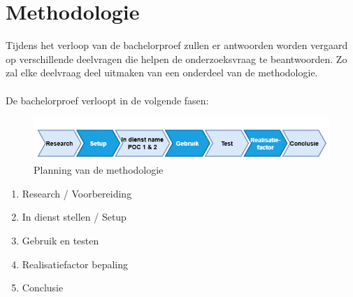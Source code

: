 

\section{Methodologie}%
\label{sec:methodologie}


Tijdens het verloop van de bachelorproef zullen er antwoorden worden vergaard op verschillende deelvragen die helpen de onderzoeksvraag te beantwoorden. Zo zal elke deelvraag deel uitmaken van een onderdeel van de methodologie.
\\\\
De bachelorproef verloopt in de volgende fasen:

\begin{figure}[h]
  \includegraphics[width=\linewidth]{../graphics/Planning.png}
  \caption{Planning van de methodologie}
  \label{fig:voorstel Planning}
\end{figure}

\begin{enumerate}
  \item Research / Voorbereiding
  \item In dienst stellen / Setup
  \item Gebruik en testen
  \item Realisatiefactor bepaling
  \item Conclusie
\end{enumerate}

